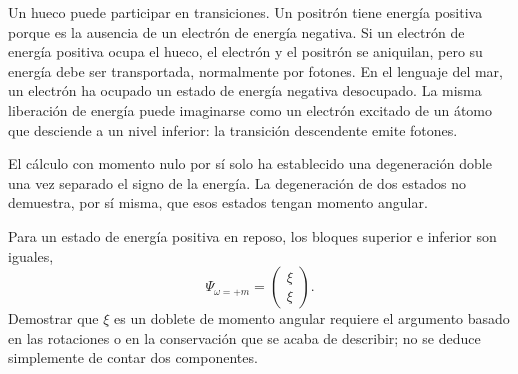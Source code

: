 \begin{classroomqa}
\end{classroomqa}

Un hueco puede participar en transiciones. Un positrón tiene energía positiva porque es la ausencia de un electrón de energía negativa. Si un electrón de energía positiva ocupa el hueco, el electrón y el positrón se aniquilan, pero su energía debe ser transportada, normalmente por fotones. En el lenguaje del mar, un electrón ha ocupado un estado de energía negativa desocupado. La misma liberación de energía puede imaginarse como un electrón excitado de un átomo que desciende a un nivel inferior: la transición descendente emite fotones.

\begin{classroomqa}
\end{classroomqa}

El cálculo con momento nulo por sí solo ha establecido una degeneración doble una vez separado el signo de la energía. La degeneración de dos estados no demuestra, por sí misma, que esos estados tengan momento angular.

\begin{classroomqa}
\end{classroomqa}

Para un estado de energía positiva en reposo, los bloques superior e inferior son iguales,
\begin{equation}
\Psi_{\omega=+m}=
\begin{pmatrix}
\xi\\
\xi
\end{pmatrix}.
\end{equation}
Demostrar que \(\xi\) es un doblete de momento angular requiere el argumento basado en las rotaciones o en la conservación que se acaba de describir; no se deduce simplemente de contar dos componentes.

